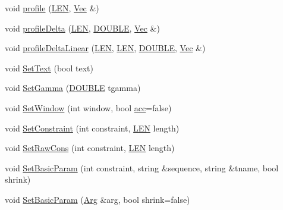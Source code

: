 \begin{DoxyCompactItemize}
\item 
void \hyperlink{class_rfold_1_1_paraso_r_a9132561f1bb3fb353fbadad884887b3d}{profile} (\hyperlink{energy__const_8hh_a05b49c662c073f89e86804f7856622a0}{L\+E\+N}, \hyperlink{namespace_rfold_aaf02f2c0c40c1dd572dbdd8bc1bde67d}{Vec} \&)
\item 
void \hyperlink{class_rfold_1_1_paraso_r_a87435a3e1db04c2fc45fae6e70dba23b}{profile\+Delta} (\hyperlink{energy__const_8hh_a05b49c662c073f89e86804f7856622a0}{L\+E\+N}, \hyperlink{energy__const_8hh_a8747af38b86aa2bbcda2f1b1aa0888c2}{D\+O\+U\+B\+L\+E}, \hyperlink{namespace_rfold_aaf02f2c0c40c1dd572dbdd8bc1bde67d}{Vec} \&)
\item 
void \hyperlink{class_rfold_1_1_paraso_r_a91ab16b811af25b9cda930affb82be10}{profile\+Delta\+Linear} (\hyperlink{energy__const_8hh_a05b49c662c073f89e86804f7856622a0}{L\+E\+N}, \hyperlink{energy__const_8hh_a05b49c662c073f89e86804f7856622a0}{L\+E\+N}, \hyperlink{energy__const_8hh_a8747af38b86aa2bbcda2f1b1aa0888c2}{D\+O\+U\+B\+L\+E}, \hyperlink{namespace_rfold_aaf02f2c0c40c1dd572dbdd8bc1bde67d}{Vec} \&)
\item 
void \hyperlink{class_rfold_1_1_paraso_r_ad932e0f36649423c72c6798de29d693e}{Set\+Text} (bool text)
\item 
void \hyperlink{class_rfold_1_1_paraso_r_a374fad3a51b681d4dbb38fc7b4590609}{Set\+Gamma} (\hyperlink{energy__const_8hh_a8747af38b86aa2bbcda2f1b1aa0888c2}{D\+O\+U\+B\+L\+E} tgamma)
\item 
void \hyperlink{class_rfold_1_1_paraso_r_a5415106a8e08ad28a53cfc88329358e9}{Set\+Window} (int window, bool \hyperlink{class_rfold_1_1_paraso_r_a70ce59c8bc0a2387ca63584e73679a09}{acc}=false)
\item 
void \hyperlink{class_rfold_1_1_paraso_r_ac1b524cf7407a1f9f2efef01435e2502}{Set\+Constraint} (int constraint, \hyperlink{energy__const_8hh_a05b49c662c073f89e86804f7856622a0}{L\+E\+N} length)
\item 
void \hyperlink{class_rfold_1_1_paraso_r_a9094d5a45d3ac46abfdc38c86378fc02}{Set\+Raw\+Cons} (int constraint, \hyperlink{energy__const_8hh_a05b49c662c073f89e86804f7856622a0}{L\+E\+N} length)
\item 
void \hyperlink{class_rfold_1_1_paraso_r_ae4b29e0f82d7cf65d66c7bfe7fcf8542}{Set\+Basic\+Param} (int constraint, string \&sequence, string \&tname, bool shrink)
\item 
void \hyperlink{class_rfold_1_1_paraso_r_ae6e89ca3ece9760c24461ff5509b6409}{Set\+Basic\+Param} (\hyperlink{class_rfold_1_1_arg}{Arg} \&arg, bool shrink=false)
\item 

\end{DoxyCompactItemize}

